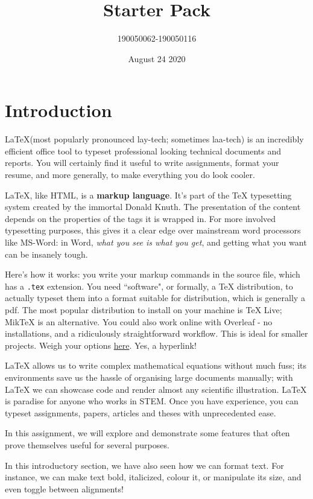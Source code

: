 \documentclass[a4paper]{article}
\title{\latex Starter Pack}
\author{190050062-190050116}
\date{August 24 2020}
\newcommand{\latex}{\LaTeX\xspace}
\newcommand{\tex}{\TeX\xspace}
\begin{document}
\maketitle
\tableofcontents
\thispagestyle{empty}
\setcounter{page}{0}
\newpage


\section{Introduction}
\latex (most popularly pronounced lay-tech; sometimes laa-tech) is an incredibly efficient office tool to typeset professional looking technical documents and reports. You will certainly find it useful to write assignments, format your resume, and more generally, to make everything you do look cooler.\par
\latex, like HTML, is a \textbf{markup language}. It's part of the \tex typesetting system created by the immortal Donald Knuth. The presentation of the content depends on the properties of the tags it is wrapped in. For more involved typesetting purposes, this gives it a clear edge over mainstream word processors like MS-Word: in Word, \textit{what you see is what you get}, and getting what you want can be insanely tough.\par
Here's how it works: you write your markup commands in the source file, which has a \texttt{.tex} extension. You need ``software", or formally, a \tex distribution, to actually typeset them into a format suitable for distribution, which is generally a pdf. The most popular distribution to install on your machine is TeX Live; MikTeX is an alternative. You could also work online with Overleaf - no installations, and a ridiculously straightforward workflow. This is ideal for smaller projects. Weigh your options \href{https://www.latex-project.org/get/}{here}. Yes, a hyperlink!\par
\latex allows us to write complex mathematical equations without much fuss; its environments save us the hassle of organising large documents manually; with \latex we can showcase code and render almost any scientific illustration. \latex is paradise for anyone who works in STEM. Once you have experience, you can typeset assignments, papers, articles and theses with unprecedented ease.\par
In this assignment, we will explore and demonstrate some features that often prove themselves useful for several purposes.\par
\begin{large}
In this introductory section, we have also seen how we can format text. For instance, we can make text bold, italicized, colour it, or manipulate its size, and even toggle between alignments!\par
\end{large}
\end{document}
